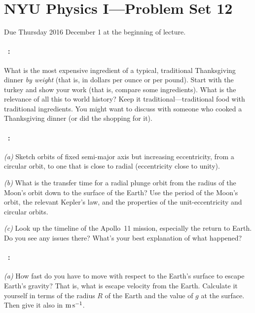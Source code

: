\documentclass[12pt]{article}
\begin{document}
\section*{NYU Physics I---Problem Set 12}

Due Thursday 2016 December 1 at the beginning of lecture.

\paragraph{\problemname~\theproblem:}%
What is the most expensive ingredient of a typical, traditional
Thanksgiving dinner \emph{by weight} (that is, in dollars per ounce or
per pound).  Start with the turkey and show your work (that is,
compare some ingredients). What is the relevance of all this to world
history? Keep it traditional---traditional food with traditional
ingredients. You might want to discuss with someone who cooked
a Thanksgiving dinner (or did the shopping for it).

\paragraph{\problemname~\theproblem:}%
\textsl{(a)}
Sketch orbits of fixed semi-major axis but increasing
eccentricity, from a circular orbit, to one that is close to radial
(eccentricity close to unity).

\textsl{(b)}
What is the transfer time for a radial plunge orbit
from the radius of the Moon's orbit down to the surface of the Earth?
Use the period of the Moon's orbit, the relevant  Kepler's law, and
the properties of the unit-eccentricity and circular orbits.

\textsl{(c)}
Look up the timeline of the Apollo~11 mission, especially
the return to Earth.  Do you see any issues there? What's your best
explanation of what happened?

\paragraph{\problemname~\theproblem:}%
\textsl{(a)}
How fast do you have to move with respect to the Earth's surface to
escape Earth's gravity? That is, what is escape velocity from the Earth.
Calculate it yourself in terms of the radius $R$ of the Earth and the
value of $g$ at the surface. Then give it also in $\mathrm{m}\,\mathrm{s}^{-1}$.
\end{document}
